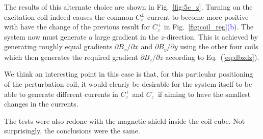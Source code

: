 The results of this alternate choice are shown in Fig.~\ref{fig:5c_z}.
Turning on the excitation coil indeed causes the common $C_z^\pm$
current to become more positive with have the change of the previous
result for $C_z^+$ in Fig.~\ref{fig:coil_reg}\textcolor{blue}{(b)}.  The system now must
generate a large gradient in the $z$-direction.  This is achieved by
generating roughly equal gradients $\partial B_x/\partial x$ and
$\partial B_y/\partial y$ using the other four coils which then
generates the required gradient $\partial B_z/\partial z$ according to
Eq.~(\ref{eq:dbzdz}).

We think an interesting point in this case is that, for this particular
positioning of the perturbation coil, it would clearly be desirable
for the system itself to be able to generate different currents in
$C_z^+$ and $C_z^-$ if aiming to have the smallest changes in the
currents.



The tests were also redone with the magnetic shield inside the coil cube.
Not surprisingly, the conclusions were the same.



